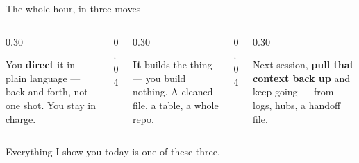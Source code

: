 \documentclass[aspectratio=169, 10pt]{beamer}
\begin{document}
\begin{frame}{The whole hour, in three moves}
\vskip6pt
\begin{columns}[T,onlytextwidth]
\begin{column}{0.30\textwidth}
\begin{tcolorbox}[keybox, title={\faComments\quad 1. Prompt \& converse}, top=3pt, bottom=3pt]
\small You \textbf{direct} it in plain language --- back-and-forth, not one shot. You stay in charge.
\end{tcolorbox}
\end{column}
\begin{column}{0.04\textwidth}
\centering\vskip1.0cm{\large\color{UVMGold}\faArrowRight}
\end{column}
\begin{column}{0.30\textwidth}
\begin{tcolorbox}[keybox, title={\faHammer\quad 2. Build}, top=3pt, bottom=3pt]
\small \textbf{It} builds the thing --- you build nothing. A cleaned file, a table, a whole repo.
\end{tcolorbox}
\end{column}
\begin{column}{0.04\textwidth}
\centering\vskip1.0cm{\large\color{UVMGold}\faArrowRight}
\end{column}
\begin{column}{0.30\textwidth}
\begin{tcolorbox}[keybox, title={\faHistory\quad 3. Recall}, top=3pt, bottom=3pt]
\small Next session, \textbf{pull that context back up} and keep going --- from logs, hubs, a handoff file.
\end{tcolorbox}
\end{column}
\end{columns}
\vskip8pt
\begin{tcolorbox}[accentbox, halign=center, top=3pt, bottom=3pt]
\small Everything I show you today is one of these three.
\end{tcolorbox}
\end{frame}
\end{document}
